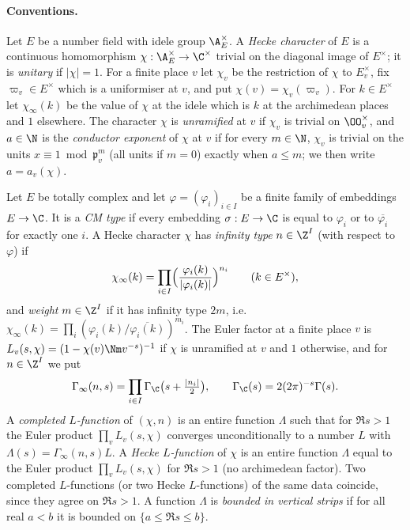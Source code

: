 \paragraph{Conventions.} Let $E$ be a number field with idele group $\A_E^\times$. A \emph{Hecke character} of $E$ is a
continuous homomorphism $\chi:\A_E^\times\to\C^\times$ trivial on the diagonal image of $E^\times$; it is \emph{unitary} if
$|\chi|=1$. For a finite place $v$ let $\chi_v$ be the restriction of $\chi$ to $E_v^\times$, fix $\varpi_v\in E^\times$ which is a
uniformiser at $v$, and put $\chi(v)=\chi_v(\varpi_v)$. For $k\in E^\times$ let $\chi_\infty(k)$ be the value of $\chi$ at the idele
which is $k$ at the archimedean places and $1$ elsewhere. The character $\chi$ is \emph{unramified} at $v$ if $\chi_v$ is trivial
on $\OO_v^\times$, and $a\in\N$ is the \emph{conductor exponent} of $\chi$ at $v$ if for every $m\in\N$, $\chi_v$ is trivial on
the units $x\equiv1\bmod\mathfrak p_v^m$ (all units if $m=0$) exactly when $a\le m$; we then write $a=a_v(\chi)$.

Let $E$ be totally complex and let $\varphi=(\varphi_i)_{i\in I}$ be a finite family of embeddings $E\to\C$. It is a
\emph{CM type} if every embedding $\sigma:E\to\C$ is equal to $\varphi_i$ or to $\overline{\varphi_i}$ for exactly one $i$. A Hecke
character $\chi$ has \emph{infinity type} $n\in\Z^I$ (with respect to $\varphi$) if
\begin{equation}\label{eq:pf:sh-div:inftype}
\chi_\infty(k)=\prod_{i\in I}\Bigl(\frac{\varphi_i(k)}{|\varphi_i(k)|}\Bigr)^{n_i}\qquad(k\in E^\times),
\end{equation}
and \emph{weight} $m\in\Z^I$ if it has infinity type $2m$, i.e.\ $\chi_\infty(k)=\prod_i(\varphi_i(k)/\overline{\varphi_i(k)})^{m_i}$.
The Euler factor at a finite place $v$ is $L_v(s,\chi)=(1-\chi(v)\Nm v^{-s})^{-1}$ if $\chi$ is unramified at $v$ and $1$ otherwise,
and for $n\in\Z^I$ we put
\[
\Gamma_\infty(n,s)=\prod_{i\in I}\shdivGC\bigl(s+\tfrac{|n_i|}2\bigr),\qquad \shdivGC(s)=2(2\pi)^{-s}\Gamma(s).
\]
A \emph{completed $L$-function} of $(\chi,n)$ is an entire function $\Lambda$ such that for $\Re s>1$ the Euler product
$\prod_vL_v(s,\chi)$ converges unconditionally to a number $L$ with $\Lambda(s)=\Gamma_\infty(n,s)L$. A \emph{Hecke $L$-function} of $\chi$ is
an entire function $\Lambda$ equal to the Euler product $\prod_vL_v(s,\chi)$ for $\Re s>1$ (no archimedean factor). Two completed
$L$-functions (or two Hecke $L$-functions) of the same data coincide, since they agree on $\Re s>1$. A function $\Lambda$ is
\emph{bounded in vertical strips} if for all real $a<b$ it is bounded on $\{a\le\Re s\le b\}$.

